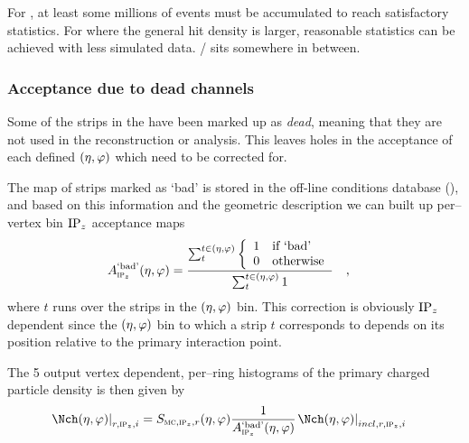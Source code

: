 
For \ppCol{}, at least some millions of events must be accumulated to
reach satisfactory statistics.  For \PbPbCol{} where the general hit
density is larger, reasonable statistics can be achieved with less
simulated data. \pPbCol{}/\PbpCol{} sits somewhere in between. 

\subsubsection{Acceptance due to dead channels}

Some of the strips in the \FMD{} have been marked up as \emph{dead},
meaning that they are not used in the reconstruction or analysis.
This leaves holes in the acceptance of each defined $(\eta,\varphi)$ which
need to be corrected for.

The map of strips marked as `bad' is stored in the off-line conditions
database (\OCDB{}), and based on this information and the geometric
description we can built up per--vertex bin $\IPz$ acceptance maps
\begin{align}
  \label{eq:dead_channels} 
  \DeadCh{} &= 
  \frac{\sum_t^{t\in\etaphi}\left\{\begin{array}{cl}
        1 & \text{if `bad'}\\
        0 & \text{otherwise}
      \end{array}\right.}{\sum_t^{t\in\etaphi} 1}\quad,
\end{align}
where $t$ runs over the strips in the $(\eta,\varphi)$ bin.  This correction
is obviously $\IPz$ dependent since the $(\eta,\varphi)$ bin to which a strip $t$
corresponds to depends on its position relative to the primary
interaction point. 

The 5 output vertex dependent, per--ring histograms of the primary
charged particle density is then given by
\begin{align}
  \dndetadphi[r,\subIPz,i] &=
  \SecMap{} \frac{1}{\DeadCh{}}\dndetadphi[incl,r,\subIPz,i]
\end{align}


